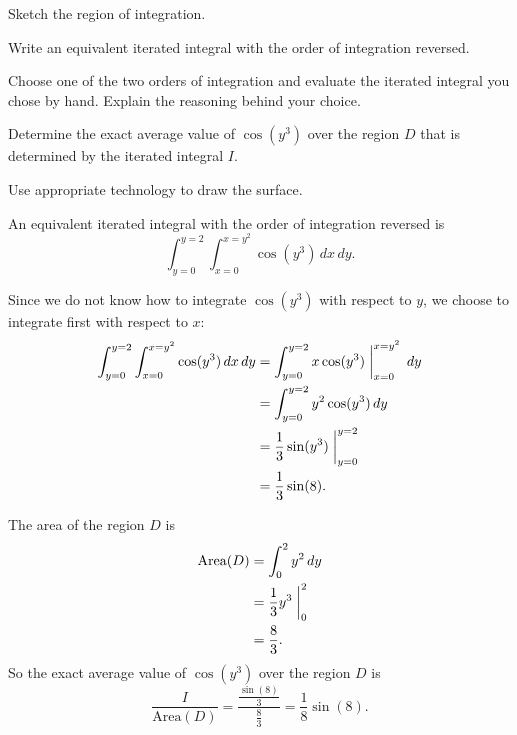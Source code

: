 \begin{exercises}
   \ba
	  \item Sketch the region of integration.
	  \item Write an equivalent iterated integral with the order of integration reversed.
	  \item Choose one of the two orders of integration and evaluate the iterated integral you chose by hand.  Explain the reasoning behind your choice.
	  \item Determine the exact average value of $\cos(y^3)$ over the region $D$ that is determined by the iterated integral $I$.
   \ea


\begin{exerciseSolution}
   \ba
	  \item Use appropriate technology to draw the surface. 
	  \item An equivalent iterated integral with the order of integration reversed is
\[ \int_{y=0}^{y=2} \int_{x=0}^{x=y^2} \cos(y^3) \, dx \, dy.\]
	  
	  \item Since we do not know how to integrate $\cos(y^3)$ with respect to $y$, we choose to integrate first with respect to $x$:
\begin{align*}
 \int_{y=0}^{y=2} \int_{x=0}^{x=y^2} \cos(y^3) \, dx \, dy &= \int_{y=0}^{y=2}  x\cos(y^3) \biggm|_{x=0}^{x=y^2}  \, dy \\
	&= \int_{y=0}^{y=2}  y^2\cos(y^3)   \, dy \\
	&= \frac{1}{3}\sin(y^3)\biggm|_{y=0}^{y=2} \\
	&= \frac{1}{3}\sin(8).
\end{align*}

	  \item The area of the region $D$ is 
\begin{align*}
\text{Area}(D) &= \int_0^2 y^2 \, dy \\
	&= \frac{1}{3}y^3 \biggm|_0^2 \\
	&= \frac{8}{3}.
\end{align*}
So the exact average value of $\cos(y^3)$ over the region $D$ is
\[\frac{I}{\text{Area}(D)} = \frac{\frac{\sin(8)}{3}}{\frac{8}{3}} = \frac{1}{8}\sin(8).\]

   \ea
\end{exerciseSolution}


\end{exercises}

\afterexercises

